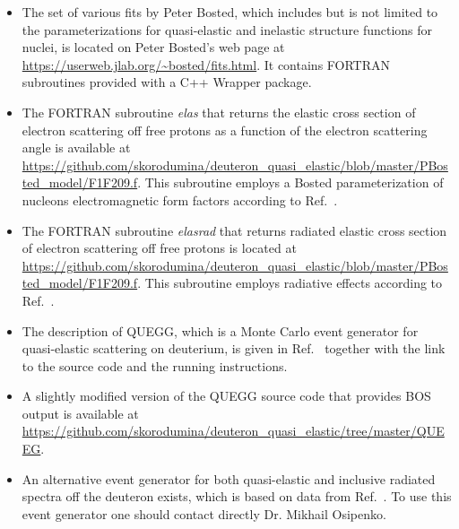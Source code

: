 \begin{itemize}


\item The set of various fits by Peter Bosted, which includes but is not limited to the parameterizations for quasi-elastic and inelastic structure functions for nuclei, is located on Peter Bosted's web page at \url{https://userweb.jlab.org/~bosted/fits.html}. It contains FORTRAN subroutines provided with a C++ Wrapper package.

\item The FORTRAN subroutine {\it elas} that returns the elastic cross section of electron scattering off free protons as a function of the electron scattering angle is available at \url{https://github.com/skorodumina/deuteron\_quasi\_elastic/blob/master/PBosted\_model/F1F209.f}. This subroutine employs a Bosted parameterization of nucleons electromagnetic form factors according to Ref.~\cite{Bosted:1994tm}.

\item The FORTRAN subroutine {\it elasrad} that returns radiated elastic cross section of electron scattering off free protons is located at \url{https://github.com/skorodumina/deuteron\_quasi\_elastic/blob/master/PBosted\_model/F1F209.f}. This subroutine employs radiative effects according to Ref.~\cite{Mo:1968cg}.

\item The description of QUEGG, which is a Monte Carlo event generator for quasi-elastic scattering on deuterium, is given in Ref.~\cite{QUEGG} together with the link to the source code and the running instructions.

\item A slightly modified version of the QUEGG source code that provides BOS output is available at \url{https://github.com/skorodumina/deuteron\_quasi\_elastic/tree/master/QUEEG}.

\item An alternative event generator for both quasi-elastic and inclusive radiated spectra off the deuteron exists, which is based on data from Ref.~\cite{Osipenko_f2note,Osipenko:2005gt}. To use this event generator one should contact directly Dr. Mikhail Osipenko.

 \end{itemize}


\newpage




